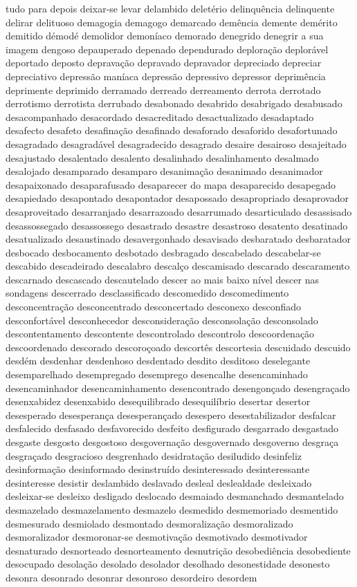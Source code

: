 \begin{appendices}
tudo para depois deixar-se levar delambido delet\'{e}rio delinqu\^{e}ncia delinquente delirar delituoso demagogia demagogo demarcado dem\^{e}ncia demente dem\'{e}rito demitido d\'{e}mod\'{e} demolidor demon\'{i}aco demorado denegrido denegrir a sua imagem dengoso depauperado depenado dependurado deplora\c{c}\~ao deplor\'{a}vel deportado deposto deprava\c{c}\~ao depravado depravador depreciado depreciar depreciativo depress\~ao man\'{i}aca depress\~ao depressivo depressor deprim\^{e}ncia deprimente deprimido derramado derreado derreamento derrota derrotado derrotismo derrotista derrubado desabonado desabrido desabrigado desabusado desacompanhado desacordado desacreditado desactualizado desadaptado desafecto desafeto desafina\c{c}\~ao desafinado desaforado desaforido desafortunado desagradado desagrad\'{a}vel desagradecido desagrado desaire desairoso desajeitado desajustado desalentado desalento desalinhado desalinhamento desalmado desalojado desamparado desamparo desanima\c{c}\~ao desanimado desanimador desapaixonado desaparafusado desaparecer do mapa desaparecido desapegado desapiedado desapontado desapontador desapossado desapropriado desaprovador desaproveitado desarranjado desarrazoado desarrumado desarticulado desassisado desassossegado desassossego desastrado desastre desastroso desatento desatinado desatualizado desaustinado desavergonhado desavisado desbaratado desbaratador desbocado desbocamento desbotado desbragado descabelado descabelar-se descabido descadeirado descalabro descal\c{c}o descamisado descarado descaramento descarnado descascado descautelado descer ao mais baixo n\'{i}vel descer nas sondagens descerrado desclassificado descomedido descomedimento desconcentra\c{c}\~ao desconcentrado desconcertado desconexo desconfiado desconfort\'{a}vel desconhecedor desconsidera\c{c}\~ao desconsola\c{c}\~ao desconsolado descontentamento descontente descontrolado descontrolo descoordena\c{c}\~ao descoordenado descorado descoro\c{c}oado descort\^{e}s descortesia descuidado descuido desd\'{e}m desdenhar desdenhoso desdentado desdito desditoso deselegante desemparelhado desempregado desemprego desencalhe desencaminhado desencaminhador desencaminhamento desencontrado desengon\c{c}ado desengra\c{c}ado desenxabidez desenxabido desequilibrado desequil\'{i}brio desertar desertor desesperado desesperan\c{c}a desesperan\c{c}ado desespero desestabilizador desfalcar desfalecido desfasado desfavorecido desfeito desfigurado desgarrado desgastado desgaste desgosto desgostoso desgoverna\c{c}\~ao desgovernado desgoverno desgra\c{c}a desgra\c{c}ado desgracioso desgrenhado desidrata\c{c}\~ao desiludido desinfeliz desinforma\c{c}\~ao desinformado desinstru\'{i}do desinteressado desinteressante desinteresse desistir deslambido deslavado desleal deslealdade desleixado desleixar-se desleixo desligado deslocado desmaiado desmanchado desmantelado desmazelado desmazelamento desmazelo desmedido desmemoriado desmentido desmesurado desmiolado desmontado desmoraliza\c{c}\~ao desmoralizado desmoralizador desmoronar-se desmotiva\c{c}\~ao desmotivado desmotivador desnaturado desnorteado desnorteamento desnutri\c{c}\~ao desobedi\^{e}ncia desobediente desocupado desola\c{c}\~ao desolado desolador desolhado desonestidade desonesto desonra desonrado desonrar desonroso desordeiro desordem 
\end{appendices}
